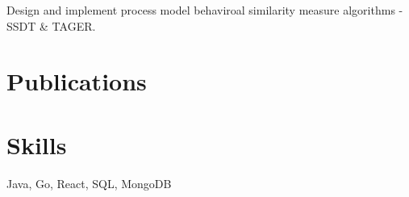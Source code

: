 \documentclass[a4paper]{resume-en}
\begin{document}
\begin{minipage}[t]{0.72\textwidth}
\sectionspace


\begin{tightitemize}
\item Design and implement process model behaviroal similarity measure algorithms - SSDT \& TAGER.
\end{tightitemize}

\sectionspace

\section{Publications} 
\renewcommand\refname{\vskip -1.8cm} %


\nocite{*}

\sectionspace


\section{Skills}

Java, Go, React, SQL, MongoDB

\end{minipage}
\end{document}
